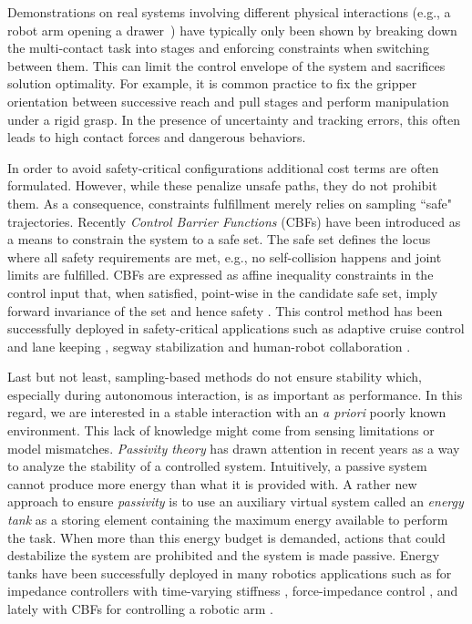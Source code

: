 Demonstrations on real systems involving different physical interactions (e.g., a robot arm opening a drawer~\cite{abraham_model-based_2020}) have typically only been shown by breaking down the multi-contact task into stages and enforcing constraints when switching between them. 
This can limit the control envelope of the system and sacrifices solution optimality. For example, it is common practice to fix the gripper orientation between successive reach and pull stages and perform manipulation under a rigid grasp. In the presence of uncertainty and tracking errors, this often leads to high contact forces and dangerous behaviors.

In order to avoid safety-critical configurations additional cost terms are often formulated. However, while these penalize unsafe paths, they do not prohibit them. As a consequence, constraints fulfillment merely relies on sampling ``safe" trajectories. 
Recently \emph{Control Barrier Functions} (CBFs) have been introduced as a means to constrain the system to a safe set. The safe set defines the locus where all safety requirements are met, e.g., no self-collision happens and joint limits are fulfilled. CBFs are expressed as affine inequality constraints in the control input that, when satisfied, point-wise in the candidate safe set, imply forward invariance of the set and hence safety \cite{ames2016control}.  This control method has been successfully deployed in safety-critical applications such as adaptive cruise control and lane keeping \cite{vahidi2003research}, segway stabilization \cite{gurriet2018towards} and human-robot collaboration \cite{benzi2021optimization}.

Last but not least, sampling-based methods do not ensure stability which, especially during autonomous interaction, is as important as performance. In this regard, we are interested in a stable interaction with an \emph{a priori} poorly known environment. This lack of knowledge might come from sensing limitations or model mismatches. \emph{Passivity theory} has drawn attention in recent years as a way to analyze the stability of a controlled system. Intuitively, a passive system cannot produce more energy than what it is provided with. A rather new approach to ensure \emph{passivity} is to use an auxiliary virtual system called an \emph{energy tank} as a storing element containing the maximum energy available to perform the task. When more than this energy budget is demanded, actions that could destabilize the system are prohibited and the system is made passive. Energy tanks have been successfully deployed in many robotics applications such as for impedance controllers with time-varying stiffness \cite{schindlbeck2015unified}, force-impedance control \cite{shahriari2018valve}, and lately with CBFs for controlling a robotic arm \cite{benzi2021optimization}.

